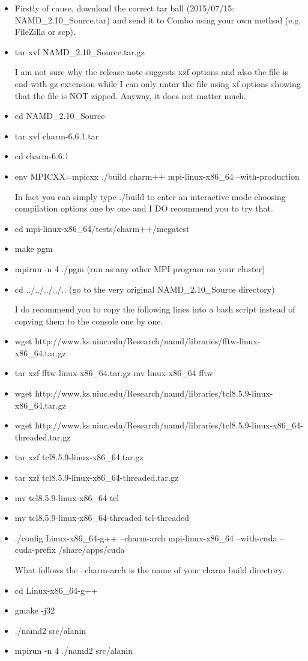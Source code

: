 \begin{itemize}
\item Firstly of cause, download the correct tar ball (2015/07/15: NAMD\_2.10\_Source.tar) and send it to Combo using your own method (e.g. FileZilla or scp).
\item tar xvf NAMD\_2.10\_Source.tar.gz
\begin{remark}
I am not sure why the release note suggests xzf options and also the file is end with gz extension while I can only untar the file using xf options showing that the file is NOT zipped. Anyway, it does not matter much. 
\end{remark}
\item cd NAMD\_2.10\_Source
\item tar xvf charm-6.6.1.tar
\item cd charm-6.6.1
\item env MPICXX=mpicxx ./build charm++ mpi-linux-x86\_64 --with-production
\begin{remark}
In fact you can simply type ./build to enter an interactive mode choosing compilation options one by one and I DO recommend you to try that. 
\end{remark}
\item cd mpi-linux-x86\_64/tests/charm++/megatest
\item make pgm
\item mpirun -n 4 ./pgm   (run as any other MPI program on your cluster)
\item cd ../../../../..   (go to the very original NAMD\_2.10\_Source directory)
\begin{remark}
I do recommend you to copy the following lines into a bash script instead of copying them to the console one by one.
\end{remark}
\item wget http://www.ks.uiuc.edu/Research/namd/libraries/fftw-linux-x86\_64.tar.gz 
\item tar xzf fftw-linux-x86\_64.tar.gz mv linux-x86\_64 fftw 
\item wget http://www.ks.uiuc.edu/Research/namd/libraries/tcl8.5.9-linux-x86\_64.tar.gz 
\item wget http://www.ks.uiuc.edu/Research/namd/libraries/tcl8.5.9-linux-x86\_64-threaded.tar.gz 
\item tar xzf tcl8.5.9-linux-x86\_64.tar.gz 
\item tar xzf tcl8.5.9-linux-x86\_64-threaded.tar.gz 
\item mv tcl8.5.9-linux-x86\_64 tcl 
\item mv tcl8.5.9-linux-x86\_64-threaded tcl-threaded
\item ./config Linux-x86\_64-g++ --charm-arch mpi-linux-x86\_64 --with-cuda --cuda-prefix /share/apps/cuda
\begin{remark}
What follows the --charm-arch is the name of your charm build directory.
\end{remark}
\item cd Linux-x86\_64-g++
\item gmake -j32
\item ./namd2 src/alanin
\item mpirun -n 4 ./namd2 src/alanin
\end{itemize}
